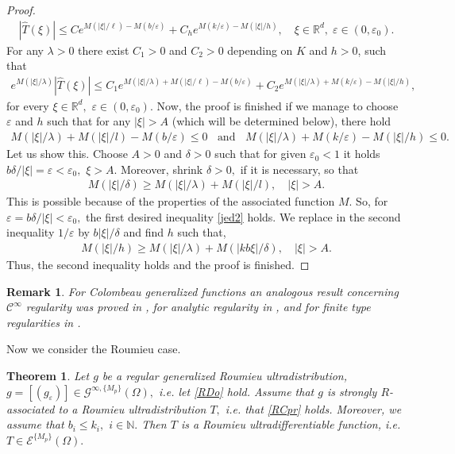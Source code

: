 \documentclass[sn-mathphys,Numbered]{sn-jnl}%
\theoremstyle{thmstyleone}%
\newtheorem{theorem}{Theorem}%
\theoremstyle{thmstyletwo}%
\newtheorem{remark}{Remark}%
\theoremstyle{thmstylethree}%
\begin{document}
\begin{proof}
\begin{align*}
\left|\hat{T}(\xi)\right| \leq Ce^{{M}({|\xi|}/{\ell})-{M}(b/{\varepsilon})} + C_h e^{{M}({k}/{\varepsilon})-M({|\xi|}/{h})}, \quad \xi\in\mathbb R^d, \;\varepsilon\in(0,\varepsilon_0).
\end{align*}
For any $\lambda>0$ there exist $C_1>0$ and $C_2>0$ depending on $K$ and $h>0$, such that
\begin{align*}
e^{M({|\xi|}/{\lambda})}\left|\hat{T}(\xi)\right| \leq C_1e^{{M}({|\xi|}/{\lambda})+{M}({|\xi|}/{\ell})-M(b/\varepsilon)} +  C_2 e^{{M}({|\xi|}/{\lambda})+{M}({k}/{\varepsilon})-{M}({|\xi|}/{h})}, 
\end{align*}
for every $\xi\in\mathbb R^d, $ $\varepsilon\in(0,\varepsilon_0).$ Now, the proof is finished if we manage to choose $\varepsilon$ and $h$ such that for any $|\xi|>A$ (which will be determined below),  there hold
\begin{align}\label{jed2}
M({|\xi|}/{\lambda})+M({|\xi|}/{l})-M(b/{\varepsilon}) \leq 0 \;\;\mbox{ and }\;\; M({|\xi|}/{\lambda})+M({k}/{\varepsilon})-M({|\xi|}/{h})\leq 0. 
\end{align}
Let  us show this.  Choose $A>0$ and $\delta>0$ such that for given $\varepsilon_0<1$ it holds $b\delta/|\xi|=\varepsilon<\varepsilon_0,$ $\xi>A.$ Moreover, shrink $\delta>0,$  if it is necessary, so that
\begin{align*}
M({|\xi|}/{\delta}) \geq M({|\xi|}/{\lambda})+M({|\xi|}/{l}), \quad |\xi|>A.
\end{align*}
This is possible because of the properties of the associated function $M$.  So, for $\varepsilon=b\delta/|\xi|<\varepsilon_0,$  the first desired inequality \eqref{jed2} holds. We replace in the second inequality $1/\varepsilon$ by $b|\xi|/\delta$ and find $h$ such that,
\begin{align*}
M(|\xi|/h) \geq M(|\xi|/\lambda)+M(|kb\xi|/\delta),  \quad |\xi|>A.
\end{align*}
Thus, the second inequality holds and the proof is finished.
\end{proof}

\begin{remark} 
For Colombeau generalized functions an analogous result concerning $\mathcal{C}^{\infty}$  regularity was proved in \cite{Sca1}, for analytic regularity in \cite{psv.1}, and for finite type regularities in  \cite{psv.2}.
\end{remark}

Now we consider the Roumieu case.
\begin{theorem}\label{r-theorem}
Let $g$ be a regular generalized Roumieu ultradistribution, $g=[(g_\varepsilon)]\in\mathcal G^{\infty,\{M_p\}}(\Omega),$ i.e. let \eqref{RDo} hold. Assume that $g$ is strongly $R$-associated to a Roumieu  ultradistribution $T,$ i.e. that \eqref{RCpr} holds. Moreover, we assume that $b_i\leq k_i,$ $i\in\mathbb{N}.$ 
Then $T$ is a Roumieu   ultradifferentiable function,  i.e.  $T\in\mathcal E^{\{M_p\}}(\Omega).$
\end{theorem}
\end{document}
